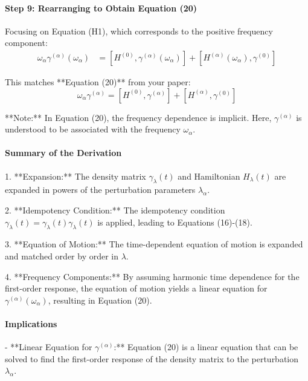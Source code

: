\paragraph{Step 9: Rearranging to Obtain Equation (20)}

Focusing on Equation (H1), which corresponds to the positive frequency component:
\begin{align}
\omega_{\alpha} \gamma^{(\alpha)}(\omega_{\alpha}) &= [H^{(0)}, \gamma^{(\alpha)}(\omega_{\alpha})] + [H^{(\alpha)}(\omega_{\alpha}), \gamma^{(0)}] 
\end{align}

This matches **Equation (20)** from your paper:
\begin{equation}
\omega_{\alpha} \gamma^{(\alpha)} = [H^{(0)}, \gamma^{(\alpha)}] + [H^{(\alpha)}, \gamma^{(0)}] 
\end{equation}

**Note:** In Equation (20), the frequency dependence is implicit. Here, \( \gamma^{(\alpha)} \) is understood to be associated with the frequency \( \omega_{\alpha} \).

\paragraph{Summary of the Derivation}

1. **Expansion:** The density matrix \( \gamma_{\lambda}(t) \) and Hamiltonian \( H_{\lambda}(t) \) are expanded in powers of the perturbation parameters \( \lambda_{\alpha} \).

2. **Idempotency Condition:** The idempotency condition \( \gamma_{\lambda}(t) = \gamma_{\lambda}(t) \gamma_{\lambda}(t) \) is applied, leading to Equations (16)-(18).

3. **Equation of Motion:** The time-dependent equation of motion is expanded and matched order by order in \( \lambda \).

4. **Frequency Components:** By assuming harmonic time dependence for the first-order response, the equation of motion yields a linear equation for \( \gamma^{(\alpha)}(\omega_{\alpha}) \), resulting in Equation (20).

\paragraph{Implications}

- **Linear Equation for \( \gamma^{(\alpha)} \):** Equation (20) is a linear equation that can be solved to find the first-order response of the density matrix to the perturbation \( \lambda_{\alpha} \).

